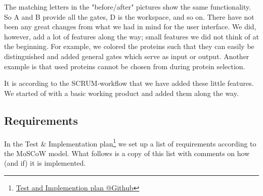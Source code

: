 \documentclass[a4paper]{article}
\makeatletter
\newcommand{\urlTestImplementation}{https://github.com/FelixAkk/synthbio/raw/master/deliverables/test-implementation/test-implementation.pdf}
\newcommand{\hrefTestImplementation}{\href{\urlTestImplementation}{Test and Implemention plan @Github}}
\makeatother
\begin{document}
The matching letters in the "before/after" pictures show the same functionality. So A and B provide all the gates, D is the workspace, and so on. There have not been any great changes from what we had in mind for the user interface. We did, however, add a lot of features along the way; small features we did not think of at the beginning. For example, we colored the proteins such that they can easily be distinguished and added general gates which serve as input or output. Another example is that used proteins cannot be chosen from during protein selection.

It is according to the SCRUM-workflow that we have added these little features. We started of with a basic working product and added them along the way.

\newpage
\subsection{Requirements}
In the Test \& Implementation plan\footnote{\hrefTestImplementation} we set up a list of requirements according to the MoSCoW model. What follows is a copy of this list with comments on how (and if) it is implemented.
\end{document}
